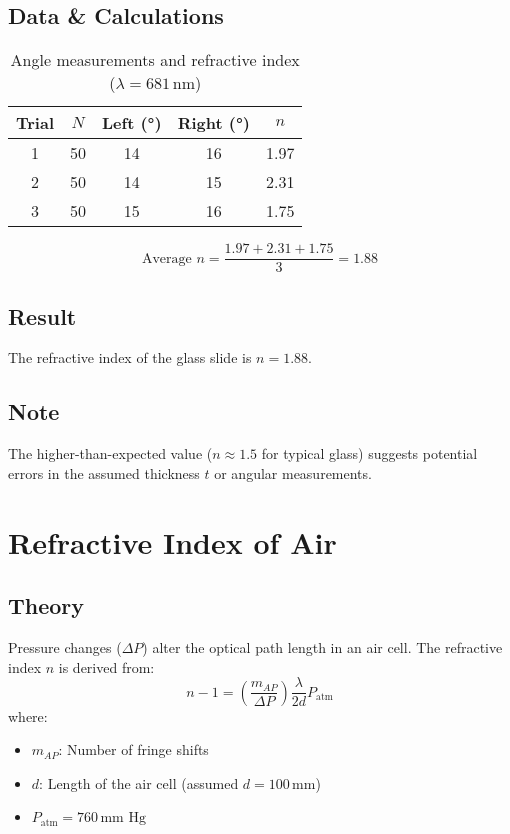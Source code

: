 \documentclass{article}
\begin{document}
\subsection{Data \& Calculations}
\begin{table}[h]
    \centering
    \caption{Angle measurements and refractive index (\( \lambda = 681 \, \text{nm} \))}
    \begin{tabular}{ccccc}
        \toprule
        Trial & \( N \) & Left (°) & Right (°) & \( n \) \\
        \midrule
        1 & 50 & 14 & 16 & 1.97 \\
        2 & 50 & 14 & 15 & 2.31 \\
        3 & 50 & 15 & 16 & 1.75 \\
        \bottomrule
    \end{tabular}
\end{table}
\[
\text{Average } n = \frac{1.97 + 2.31 + 1.75}{3} = 1.88
\]

\subsection{Result}
The refractive index of the glass slide is \( n = \boxed{1.88} \).

\subsection{Note}
The higher-than-expected value (\( n \approx 1.5 \) for typical glass) suggests potential errors in the assumed thickness \( t \) or angular measurements.

\section{Refractive Index of Air}
\subsection{Theory}
Pressure changes (\( \Delta P \)) alter the optical path length in an air cell. The refractive index \( n \) is derived from:
\[
n - 1 = \left( \frac{m_{AP}}{\Delta P} \right) \frac{\lambda}{2d} P_{\text{atm}}
\]
where:
\begin{itemize}
    \item \( m_{AP} \): Number of fringe shifts
    \item \( d \): Length of the air cell (assumed \( d = 100 \, \text{mm} \))
    \item \( P_{\text{atm}} = 760 \, \text{mm Hg} \)
\end{itemize}
\end{document}
